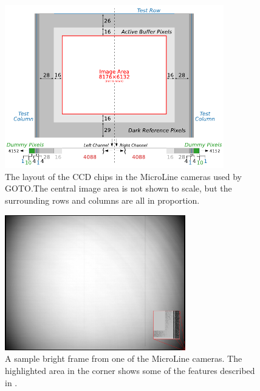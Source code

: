 \begin{colsection}
\begin{colsection}
\begin{figure}[p]
    \begin{center}
        \includegraphics[width=0.85\textwidth]{images/chip}
    \end{center}
    \caption[The layout of the CCD chips in the MicroLine cameras used by GOTO]{
        The layout of the CCD chips in the MicroLine cameras used by GOTO.\@ The central image area is not shown to scale, but the surrounding rows and columns are all in proportion.
    }\label{fig:chip}
\end{figure}

\begin{figure}[p]
    \begin{center}
        \includegraphics[width=0.7\textwidth]{images/sample.png}
    \end{center}
    \caption[A sample bright frame from one of the MicroLine cameras]{
        A sample bright frame from one of the MicroLine cameras. The highlighted area in the corner shows some of the features described in .
    }\label{fig:frame}
\end{figure}


\end{colsection}
\end{colsection}

